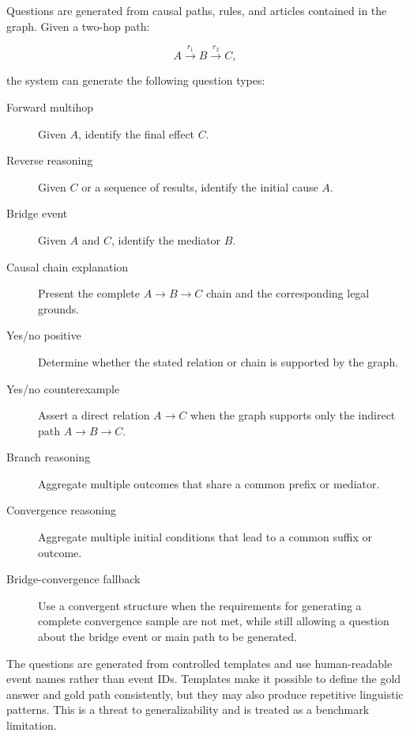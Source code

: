 Questions are generated from causal paths, rules, and articles contained in
the graph. Given a two-hop path:

\[
A \xrightarrow{r_1} B \xrightarrow{r_2} C,
\]

the system can generate the following question types:

\begin{description}
    \item[Forward multihop] Given \(A\), identify the final effect \(C\).

    \item[Reverse reasoning] Given \(C\) or a sequence of results, identify
    the initial cause \(A\).

    \item[Bridge event] Given \(A\) and \(C\), identify the mediator \(B\).

    \item[Causal chain explanation] Present the complete
    \(A \rightarrow B \rightarrow C\) chain and the corresponding legal
    grounds.

    \item[Yes/no positive] Determine whether the stated relation or chain is
    supported by the graph.

    \item[Yes/no counterexample] Assert a direct relation
    \(A \rightarrow C\) when the graph supports only the indirect path
    \(A \rightarrow B \rightarrow C\).

    \item[Branch reasoning] Aggregate multiple outcomes that share a common
    prefix or mediator.

    \item[Convergence reasoning] Aggregate multiple initial conditions that
    lead to a common suffix or outcome.

    \item[Bridge-convergence fallback] Use a convergent structure when the
    requirements for generating a complete convergence sample are not met,
    while still allowing a question about the bridge event or main path to be
    generated.
\end{description}

The questions are generated from controlled templates and use human-readable
event names rather than event IDs. Templates make it possible to define the
gold answer and gold path consistently, but they may also produce repetitive
linguistic patterns. This is a threat to generalizability and is treated as a
benchmark limitation.

